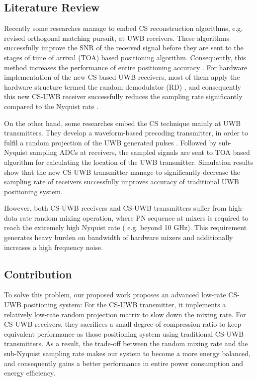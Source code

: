 \subsection{Literature Review}

Recently some researches manage to embed CS reconstruction algorithms, e.g. revised orthogonal matching pursuit, at UWB receivers. These algorithms successfully improve the SNR of the received signal before they are sent to the stages of time of arrival (TOA) based positioning algorithm. Consequently, this method increases the performance of entire positioning accuracy \cite{banitalebi2014compressive}. For hardware implementation of the new CS based UWB receivers, most of them apply the hardware structure termed the random demodulator (RD) \cite{kirolos2006analog}, and consequently this new CS-UWB receiver successfully reduces the sampling rate significantly compared to the Nyquist rate \cite{yang2011compressive}.

On the other hand, some researches embed the CS technique mainly at UWB transmitters. They develop a waveform-based precoding transmitter, in order to fulfil a random projection of the UWB generated pulses \cite{zhang2009compressed}. Followed by sub-Nyquist sampling ADCs at receivers, the sampled signals are sent to TOA based algorithm for calculating the location of the UWB transmitter. Simulation results show that the new CS-UWB transmitter manage to significantly decrease the sampling rate of receivers successfully improves accuracy of traditional UWB positioning system. 

However, both CS-UWB receivers and CS-UWB transmitters suffer from high-data rate random mixing operation, where PN sequence at mixers is required to reach the extremely high Nyquist rate ( e.g. beyond 10 GHz). This requirement generates heavy burden on bandwidth of hardware mixers and additionally increases a high frequency noise. 

\subsection{Contribution}

To solve this problem, our proposed work proposes an advanced low-rate CS-UWB positioning system: For the CS-UWB transmitter, it implements a relatively low-rate random projection matrix to slow down the mixing rate. For CS-UWB receivers, they sacrifices a small degree of compression ratio to keep equivalent performance as those positioning system using traditional CS-UWB transmitters. As a result, the trade-off between the random mixing rate and the sub-Nyquist sampling rate makes our system to become a more energy balanced, and consequently gains a better performance in entire power consumption and energy efficiency.  

